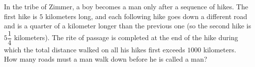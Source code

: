 In the tribe of Zimmer, a boy becomes a man only after a sequence of hikes. The first hike is $5$ kilometers long, and each following hike goes down a different road and is a quarter of a kilometer longer than the previous one (so the second hike is $5\dfrac14$ kilometers). The rite of passage is completed at the end of the hike during which the total distance walked on all his hikes first exceeds $1000$ kilometers. How many roads must a man walk down before he is called a man?
